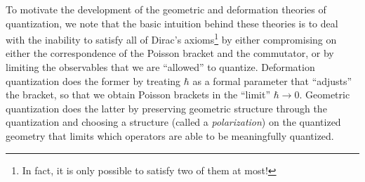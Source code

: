 To motivate the development of the geometric and deformation theories of quantization, we note that the basic intuition behind these theories is to deal with the inability to satisfy all of Dirac's axioms\footnote{In fact, it is only possible to satisfy two of them at most!} by either compromising on either the correspondence of the Poisson bracket and the commutator, or by limiting the observables that we are ``allowed'' to quantize. Deformation quantization does the former by treating $\hbar$ as a formal parameter that ``adjusts'' the bracket, so that we obtain Poisson brackets in the ``limit'' $\hbar \to 0$. Geometric quantization does the latter by preserving geometric structure through the quantization and choosing a structure (called a \emph{polarization}) on the quantized geometry that limits which operators are able to be meaningfully quantized.


